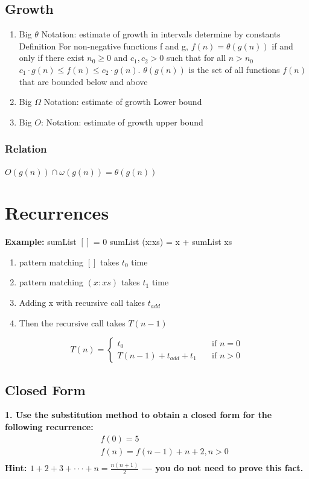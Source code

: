 \begin{multicols}{2}
\subsection{Growth}
\begin{enumerate}
\item Big $ \theta $ Notation: estimate of growth in intervals determine by constants
  Definition
  For non-negative functions f and g, $f (n) = \theta (g (n))$ if and only if there
  exist $ n_0 \geq 0 $ and $ c_1 , c_2 > 0 $ such that for all $ n > n_0 $
  $ c_1 \cdot g (n) \leq f (n) \leq c_2 \cdot g (n) $.
  $ \theta (g (n)) $ is the set of all functions $ f(n) $ that are bounded below and above
\item Big $ \Omega $ Notation: estimate of growth Lower bound
\item Big $ O $: Notation: estimate of growth upper bound
\end{enumerate}


\subsubsection{Relation}
$O(g(n)) \cap \omega (g(n)) = \theta (g(n))$


\section{Recurrences}
\noindent\textbf{Example:} \newline
sumList $[]$ = 0 \newline
sumList (x:xs) = x + sumList xs

\begin{enumerate}
\item pattern matching $[]$ takes $t_0$ time
\item pattern matching $(x:xs)$ takes $t_1$ time
\item Adding x with recursive call takes $t_{add}$
\item Then the recursive call takes $T(n-1)$
\end{enumerate}

\[ T(n) =
  \begin{cases}
    t_0                   & \quad \text{if } n = 0 \\
    T(n-1)+t_{add} +t_{1}  & \quad \text{if } n > 0 
  \end{cases}
\]


\subsection{Closed Form}
\noindent\textbf{1. Use the substitution method to obtain a closed form for the following recurrence:}
\begin{align*}
  &\quad  f(0) = 5 \\
  &\quad  f(n) = f(n -1) + n + 2, n> 0 \\
\end{align*}
\textbf{Hint: $1 + 2 + 3 + · · · + n = \frac{n(n+1)}{2}$ — you do not need to prove this fact.}



\end{multicols}
